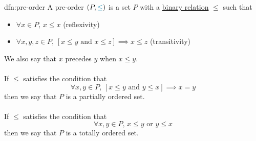 \begin{dfn}{dfn:pre-order}
    A \textcolor{dfn-color}{pre-order} \( (P, \textcolor{dfn-color}{\leq}) \) is a set \( P \) with a \hyperref[dfn:relation]{binary relation} \( \leq \) such that
    \begin{itemize}
        \item \( \forall x \in P, \, x \leq x \) (reflexivity)
        \item \( \forall x, y, z \in P, \, [x \leq y \text{ and } x \leq z] \implies x \leq z \) (transitivity)
    \end{itemize}
    We also say that \( x \) \textcolor{dfn-color}{precedes} \( y \) when \( x \leq y \).
    \\ \\
    If \( \leq \) satisfies the condition that
    \[
        \forall x, y \in P, \, [x \leq y \text{ and } y \leq x] \implies x = y
    \]
    then we say that \( P \) is a \textcolor{dfn-color}{partially ordered set}.
    \\ \\
    If \( \leq \) satisfies the condition that
    \[
        \forall x, y \in P, \, x \leq y \text{ or } y \leq x
    \]
    then we say that \( P \) is a \textcolor{dfn-color}{totally ordered set}.
\end{dfn}

